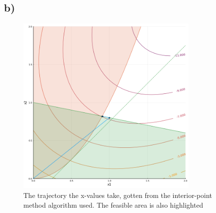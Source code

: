 \documentclass{article}
\begin{document}
	\subsection*{b)}
	\begin{figure}[H]
		\includegraphics[width=0.8\textwidth]{SQP_example.png}
		\caption{The trajectory the x-values take, gotten from the interior-point method algorithm used. The feasible area is also highlighted}
		\label{fig:3b}
	\end{figure}
\end{document}
